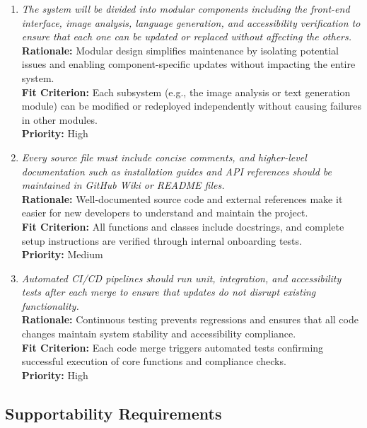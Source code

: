 \documentclass[12pt]{article}
\begin{document}
\begin{enumerate}[label=MS-MNT\arabic*., wide=0pt, leftmargin=*]
  \item \emph{The system will be divided into modular components including the front-end interface, image analysis, language generation, and accessibility verification to ensure that each one can be updated or replaced without affecting the others.}\\[2mm]
    {\bf Rationale:} Modular design simplifies maintenance by isolating potential issues and enabling component-specific updates without impacting the entire system.\\
    {\bf Fit Criterion:} Each subsystem (e.g., the image analysis or text generation module) can be modified or redeployed independently without causing failures in other modules.\\
    {\bf Priority:} High

  \item \emph{Every source file must include concise comments, and higher-level documentation such as installation guides and API references should be maintained in GitHub Wiki or README files.}\\[2mm]
    {\bf Rationale:} Well-documented source code and external references make it easier for new developers to understand and maintain the project.\\
    {\bf Fit Criterion:} All functions and classes include docstrings, and complete setup instructions are verified through internal onboarding tests.\\
    {\bf Priority:} Medium

  \item \emph{Automated CI/CD pipelines should run unit, integration, and accessibility tests after each merge to ensure that updates do not disrupt existing functionality.}\\[2mm]
    {\bf Rationale:} Continuous testing prevents regressions and ensures that all code changes maintain system stability and accessibility compliance.\\
    {\bf Fit Criterion:} Each code merge triggers automated tests confirming successful execution of core functions and compliance checks.\\
    {\bf Priority:} High
\end{enumerate}

\subsection{Supportability Requirements}
\end{document}
